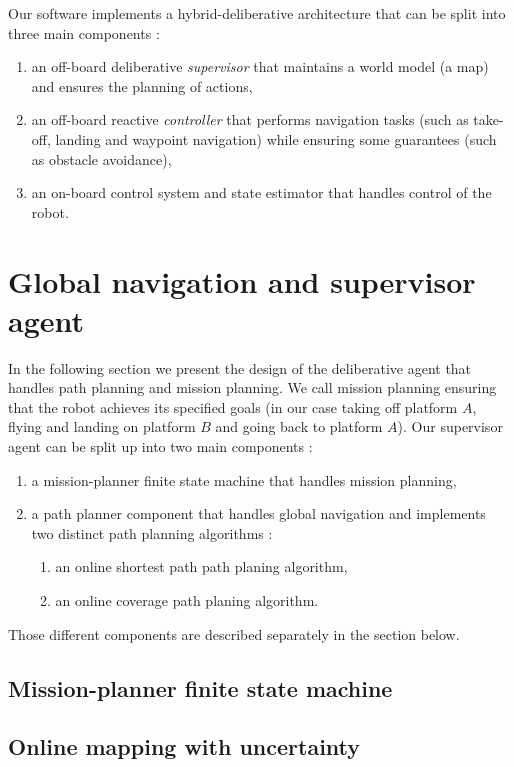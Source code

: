 \documentclass[11pt]{article}
\begin{document}
Our software implements a hybrid-deliberative architecture that can be split into three main components :
\begin{enumerate}
    \item an off-board deliberative \textit{supervisor} that maintains a world model (a map) and ensures the planning of actions,
    \item an off-board reactive \textit{controller} that performs navigation tasks (such as take-off, landing and waypoint navigation) while ensuring some guarantees (such as obstacle avoidance),
    \item an on-board control system and state estimator that handles control of the robot.
\end{enumerate}


\section{Global navigation and supervisor agent}

In the following section we present the design of the deliberative agent that handles path planning and mission planning. We call mission planning ensuring that the robot achieves its specified goals (in our case taking off platform $A$, flying and landing on platform $B$ and going back to platform $A$). Our supervisor agent can be split up into two main components : 
\begin{enumerate}
    \item a mission-planner finite state machine that handles mission planning,
    \item a path planner component that handles global navigation and implements two distinct path planning algorithms : 
    \begin{enumerate}
        \item an online shortest path path planing algorithm,
        \item an online coverage path planing algorithm.
    \end{enumerate}
\end{enumerate}

Those different components are described separately in the section below.


\subsection{Mission-planner finite state machine}

\subsection{Online mapping with uncertainty}
\end{document}
